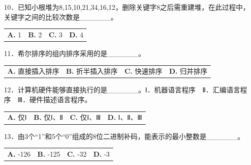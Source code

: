 \documentclass[UTF8,11pt]{ctexart}
\begin{document}
10．已知小根堆为8,15,10,21,34,16,12，删除关键字8之后需重建堆，在此过程中，关键字之间的比较次数是\_\_\_\_\_\_。


\begin{center}\begin{tabular}{>{\raggedright\arraybackslash}p{\dimexpr(\linewidth-8\tabcolsep)/4\relax}>{\raggedright\arraybackslash}p{\dimexpr(\linewidth-8\tabcolsep)/4\relax}>{\raggedright\arraybackslash}p{\dimexpr(\linewidth-8\tabcolsep)/4\relax}>{\raggedright\arraybackslash}p{\dimexpr(\linewidth-8\tabcolsep)/4\relax}}
\textbf{A.} 1 & \textbf{B.} 2 & \textbf{C.} 3 & \textbf{D.} 4\\[.35em]\end{tabular}\end{center}

11．希尔排序的组内排序采用的是\_\_\_\_\_\_。


\begin{center}\begin{tabular}{>{\raggedright\arraybackslash}p{\dimexpr(\linewidth-8\tabcolsep)/4\relax}>{\raggedright\arraybackslash}p{\dimexpr(\linewidth-8\tabcolsep)/4\relax}>{\raggedright\arraybackslash}p{\dimexpr(\linewidth-8\tabcolsep)/4\relax}>{\raggedright\arraybackslash}p{\dimexpr(\linewidth-8\tabcolsep)/4\relax}}
\textbf{A.} 直接插入排序 & \textbf{B.} 折半插入排序 & \textbf{C.} 快速排序 & \textbf{D.} 归并排序\\[.35em]\end{tabular}\end{center}

12．计算机硬件能够直接执行的是\_\_\_\_\_\_。Ⅰ．机器语言程序　Ⅱ．汇编语言程序　Ⅲ．硬件描述语言程序。


\begin{center}\begin{tabular}{>{\raggedright\arraybackslash}p{\dimexpr(\linewidth-8\tabcolsep)/4\relax}>{\raggedright\arraybackslash}p{\dimexpr(\linewidth-8\tabcolsep)/4\relax}>{\raggedright\arraybackslash}p{\dimexpr(\linewidth-8\tabcolsep)/4\relax}>{\raggedright\arraybackslash}p{\dimexpr(\linewidth-8\tabcolsep)/4\relax}}
\textbf{A.} 仅Ⅰ & \textbf{B.} 仅Ⅰ、Ⅱ & \textbf{C.} 仅Ⅰ、Ⅲ & \textbf{D.} Ⅰ、Ⅱ、Ⅲ\\[.35em]\end{tabular}\end{center}

13．由3个“1”和5个“0”组成的8位二进制补码，能表示的最小整数是\_\_\_\_\_\_。


\begin{center}\begin{tabular}{>{\raggedright\arraybackslash}p{\dimexpr(\linewidth-8\tabcolsep)/4\relax}>{\raggedright\arraybackslash}p{\dimexpr(\linewidth-8\tabcolsep)/4\relax}>{\raggedright\arraybackslash}p{\dimexpr(\linewidth-8\tabcolsep)/4\relax}>{\raggedright\arraybackslash}p{\dimexpr(\linewidth-8\tabcolsep)/4\relax}}
\textbf{A.} -126 & \textbf{B.} -125 & \textbf{C.} -32 & \textbf{D.} -3\\[.35em]\end{tabular}\end{center}
\end{document}
